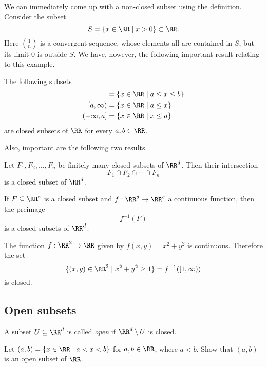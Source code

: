 \documentclass{article}
\begin{document}
We can immediately come up with a non-closed subset using the definition. Consider the subset
$$
S = \{x\in \RR \mid x > 0\}\subset \RR.
$$
Here $\left(\frac{1}{n}\right)$ is a convergent sequence, whose elements all are
contained in $S$, but its limit $0$ is outside $S$.
We have, however, the following important result relating to this example.

\begin{proposition}
  The following subsets
  \begin{align*}
    [a, b] &= \{x\in \RR \mid a \leq x \leq b\} \\
    [a, \infty) &= \{x\in \RR \mid a \leq x\}\\
    (-\infty, a] &= \{x\in \RR \mid x \leq a\}
  \end{align*}
  are closed subsets of $\RR$ for every $a, b\in \RR$.
\end{proposition}

Also, important are the following two results.

\begin{proposition}
  Let $F_1, F_2, \dots, F_n$ be finitely many closed subsets of $\RR^d$. Then their
  intersection
  $$
  F_1 \cap F_2 \cap \cdots \cap F_n
  $$
  is a closed subset of $\RR^d$.
\end{proposition}

\begin{proposition}[emph]
  If $F\subseteq \RR^e$ is a closed subset and $f: \RR^d\rightarrow \RR^e$
  a continuous function, then the preimage
  $$
  f^{-1}(F)
  $$
  is a closed subsets of $\RR^d$.
\end{proposition}

\begin{example}
  The function $f:\RR^2\rightarrow \RR$ given by $f(x, y) = x^2 + y^2$ is
  continuous. Therefore the set
  $$
  \{(x, y)\in \RR^2\mid x^2 + y^2 \geq 1\} = f^{-1}([1, \infty))
  $$
  is closed.
  \end{example}


  \subsection{Open subsets}

  A subset $U\subseteq \RR^d$ is called \emph{open} if $\RR^d\setminus U$ is closed.


  \beginshex
  Let $(a, b) =\{x \in \RR \mid a < x < b\}$ for $a, b\in \RR$, where $a < b$.
  Show that $(a, b)$ is an open subset of $\RR$.
  \endshex
  
\end{document}
